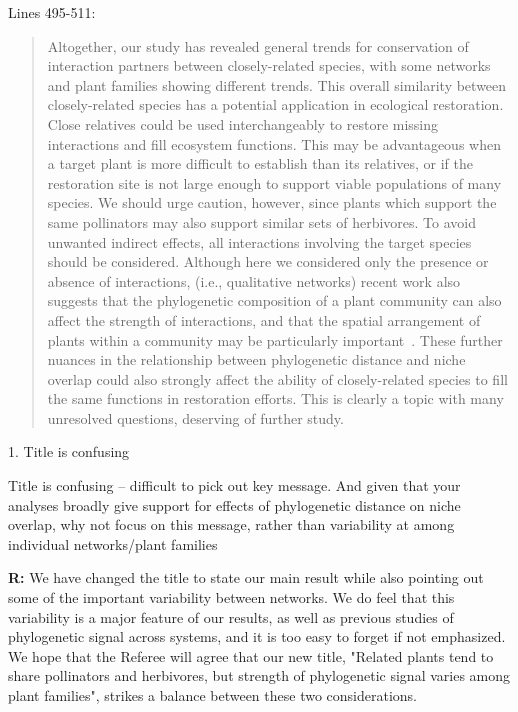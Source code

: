 \documentclass[12pt]{letter}
\newenvironment{refquote}{\bigskip \begin{it}}{\end{it}\smallskip}
\begin{document}
	Lines 495-511:

	\begin{quotation}

		Altogether, our study has revealed general trends for conservation of interaction
		partners between closely-related species, with some networks and plant 
		families showing different trends. This overall similarity between closely-related
		species has a potential application in ecological restoration. Close relatives could
		be used interchangeably to restore missing interactions and fill ecosystem functions. 
		This may be advantageous when a target plant is more difficult to establish than its
		relatives, or if the restoration site is not large enough to support viable populations 
		of many species. We should urge caution, however, since plants which support the
		same pollinators may also support similar sets of herbivores. To avoid unwanted 
		indirect effects, all interactions involving the target species should be considered.
		Although here we considered only the presence or absence of interactions,
		(i.e., qualitative networks)
		recent work also suggests that the phylogenetic composition of a plant
		community can also affect the strength of 
		interactions, and that the spatial arrangement of plants within a 
		community may be particularly important~\citep{Yguel2011,Castagneyrol2014}.
		These further nuances in the relationship between phylogenetic distance and 
		niche overlap could also strongly affect the ability of closely-related species to
		fill the same functions in restoration efforts. This is clearly a topic with many
		unresolved questions, deserving of further study.

	\end{quotation}


	1. Title is confusing

		\begin{refquote}
			Title is confusing – difficult to pick out key message. And given that your analyses broadly give support for effects of phylogenetic distance on niche overlap, why not focus on this message, rather than variability at among individual networks/plant families
		\end{refquote}


		\textbf{R:} We have changed the title to state our main result while also pointing out some of the important variability between networks. We do feel that this variability is a major feature of our results, as well as previous studies of phylogenetic signal across systems, and it is too easy to forget if not emphasized. We hope that the Referee will agree that our new title, "Related plants tend to share pollinators and herbivores, but strength of phylogenetic signal varies among plant families", strikes a balance between these two considerations.
\end{document}
